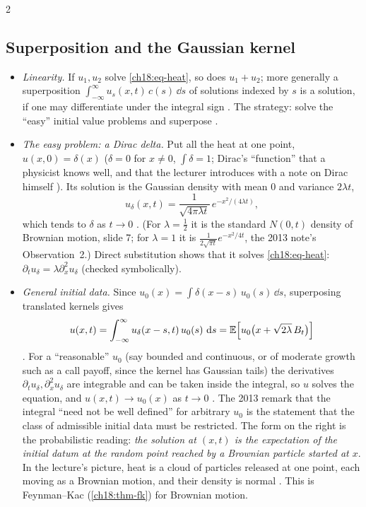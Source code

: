 \begin{paracol}{2}
\subsection{Superposition and the Gaussian kernel}
\begin{itemize}
  \item \emph{Linearity.} If $u_1,u_2$ solve \eqref{ch18:eq-heat}, so does $u_1+u_2$; more generally a superposition $\int_{-\infty}^\infty u_s(x,t)\,c(s)\,\dd s$ of solutions indexed by $s$ is a solution, if one may differentiate under the integral sign . The strategy: solve the ``easy'' initial value problems and superpose .
  \item \emph{The easy problem: a Dirac delta.} Put all the heat at one point, $u(x,0)=\delta(x)$ ($\delta=0$ for $x\ne0$, $\int\delta=1$; Dirac's ``function'' that a physicist knows well, and that the lecturer introduces with a note on Dirac himself ). Its solution is the Gaussian density with mean $0$ and variance $2\lambda t$,
  \begin{equation}\label{ch18:eq-kernel}
    u_\delta(x,t)=\frac1{\sqrt{4\pi\lambda t}}\,e^{-x^2/(4\lambda t)} ,
  \end{equation}
  which tends to $\delta$ as $t\to0$ . (For $\lambda=\tfrac12$ it is the standard $N(0,t)$ density of Brownian motion, slide 7; for $\lambda=1$ it is $\frac1{2\sqrt{\pi t}}e^{-x^2/4t}$, the 2013 note's Observation~2.) Direct substitution shows that it solves \eqref{ch18:eq-heat}: $\partial_tu_\delta=\lambda\partial_x^2u_\delta$ (checked symbolically).
  \item \emph{General initial data.} Since $u_0(x)=\int\delta(x-s)\,u_0(s)\,\dd s$, superposing translated kernels gives
  \begin{equation}\label{ch18:eq-conv}
    u(x,t)=\int_{-\infty}^\infty u_\delta(x-s,t)\,u_0(s)\,\,\mathrm{d} s=\mathbb{E}\Bigl[u_0\bigl(x+\sqrt{2\lambda}\,B_t\bigr)\Bigr]
  \end{equation}
  . For a ``reasonable'' $u_0$ (say bounded and continuous, or of moderate growth such as a call payoff, since the kernel has Gaussian tails) the derivatives $\partial_tu_\delta,\partial_x^2u_\delta$ are integrable and can be taken inside the integral, so $u$ solves the equation, and $u(x,t)\to u_0(x)$ as $t\to0$ . The 2013 remark that the integral ``need not be well defined'' for arbitrary $u_0$ is the statement that the class of admissible initial data must be restricted. The form on the right is the probabilistic reading: \emph{the solution at $(x,t)$ is the expectation of the initial datum at the random point reached by a Brownian particle started at $x$}. In the lecture's picture, heat is a cloud of particles released at one point, each moving as a Brownian motion, and their density is normal . This is Feynman--Kac (\cref{ch18:thm-fk}) for Brownian motion.

\end{itemize}
\end{paracol}
